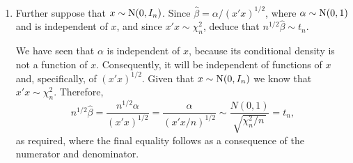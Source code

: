 \begin{enumerate}
\begin{enumerate}
      \item Further suppose that \( x\sim\operatorname{N}(0,I_{n}) \).  Since \( \hat{\beta}=\alpha/(x'x)^{1/2} 
            \), where \( \alpha\sim\operatorname{N}(0,1) \) and is independent of \( x \), and since \( 
            x'x\sim\chi^{2}_{n} \), deduce that \( n^{1/2}\hat{\beta}\sim t_{n} \).
            
            \solution
            We have seen that \( \alpha \) is independent of \( x \), because its conditional density is not a 
            function of \( x \).  Consequently, it will be independent of functions of \( x \) and, 
            specifically, of \( (x'x)^{1/2} \).  Given that \( x\sim\operatorname{N}(0,I_{n}) \) we know that \( 
            x'x\sim\chi^{2}_{n} \).  Therefore,
            \[ 
               n^{1/2}\hat{\beta}=\frac{n^{1/2}\alpha}{(x'x)^{1/2}}=\frac{\alpha}{(x'x/n)^{1/2}}
               \sim\frac{N(0,1)}{\sqrt{\chi^{2}_{n}/n\,}}=t_{n},
            \]
            as required, where the final equality follows as a consequence of the numerator and 
            denominator.
   \end{enumerate}


\end{enumerate}
